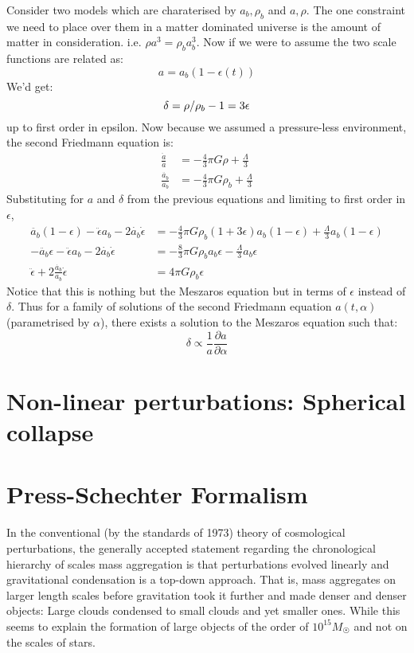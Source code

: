 \documentclass[12pt,a4paper,oneside]{book}
\def\pa{{\partial}}
\begin{document}
			Consider two models which are charaterised by $a_b,\rho_b$ and $a,\rho$. The one constraint we need to place over them in a matter dominated universe is the amount of matter in consideration. i.e. $\rho a^3=\rho_b a_b^3$. Now if we were to assume the two scale functions are related as:
			$$a=a_b(1-\epsilon(t))$$
			We'd get:
			\begin{equation}
				\delta=\rho/\rho_b-1=3\epsilon\\
				\label{eq:rho-rho_b}
			\end{equation}
			up to first order in epsilon. Now because we assumed a pressure-less environment, the second Friedmann equation is:
			$$\begin{aligned}
			\frac{\ddot{a}}{a}&=-\frac{4}{3}\pi G\rho+\frac{\Lambda}{3}\\
			\frac{\ddot{a_b}}{a_b}&=-\frac{4}{3}\pi G\rho_b+\frac{\Lambda}{3}
			\end{aligned}
			$$
			Substituting for $a$ and $\delta$ from the previous equations and limiting to first order in $\epsilon$,
			\begin{equation}
				\begin{aligned}
					\ddot{a_b}(1-\epsilon)-\ddot{\epsilon}a_b-2\dot{a_b}\dot{\epsilon}&=-\frac{4}{3}\pi G\rho_b(1+3\epsilon)a_b(1-\epsilon)+\frac{\Lambda}{3}a_b(1-\epsilon)\\
					-\ddot{a_b}\epsilon-\ddot{\epsilon}a_b-2\dot{a_b}\dot{\epsilon}&=-\frac{8}{3}\pi G\rho_ba_b\epsilon-\frac{\Lambda}{3}a_b\epsilon\\
					\ddot{\epsilon}+2\frac{\dot{a_b}}{a_b}\dot{\epsilon}&=4\pi G\rho_b\epsilon
				\end{aligned}
			\end{equation}
			Notice that this is nothing but the Meszaros equation but in terms of $\epsilon$ instead of $\delta$. Thus for a family of solutions of the second Friedmann equation $a(t,\alpha)$ (parametrised by $\alpha$), there exists a solution to the Meszaros equation such that:
			$$
			\delta\propto\frac{1}{a}\frac{\pa a}{\pa\alpha}
			$$
	\section{Non-linear perturbations: Spherical collapse}
	\section{Press-Schechter Formalism}
		In the conventional (by the standards of 1973) theory of cosmological perturbations,	the generally accepted statement regarding the chronological hierarchy of scales mass aggregation is that perturbations evolved linearly and gravitational condensation is a top-down approach. That is, mass aggregates on larger length scales before gravitation took it further and made denser and denser objects: Large clouds condensed to small clouds and yet smaller ones. While this seems to explain the formation of large objects of the order of $10^{15}M_\Sun$ and not on the scales of stars.
		
\end{document}
